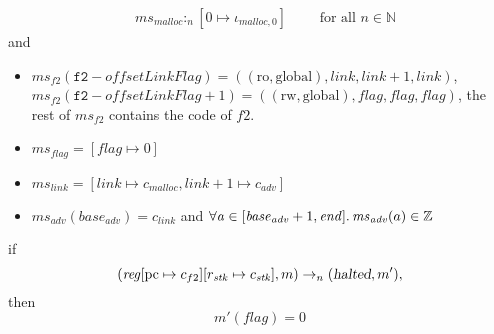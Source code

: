 \documentclass[a4paper]{article}
\newcommand{\update}[2]{[#1 \mapsto #2]}
\newcommand{\var}[1]{\mathit{#1}}
\newcommand{\hs}{\var{ms}}
\newcommand{\ms}{\hs}
\newcommand{\pcreg}{\mathrm{pc}}
\newcommand{\addr}{\var{a}}
\newcommand{\start}{\var{base}}
\newcommand{\addrend}{\var{end}}
\newcommand{\reg}{\var{reg}}
\newcommand{\heap}{\var{mem}}
\newcommand{\adv}{\var{adv}}
\newcommand{\link}{\var{link}}
\newcommand{\stk}{\var{stk}}
\newcommand{\flag}{\var{flag}}
\newcommand{\olf}{\var{offsetLinkFlag}}
\newcommand{\halted}{\textsl{halted}}
\newcommand{\heapSat}[3][\heap]{#1 :_{#2} #3}
\newcommand{\codelabel}[1]{\mathit{#1}}
\newcommand{\malloc}{\codelabel{malloc}}
\newcommand{\nats}{\mathbb{N}}
\newcommand{\ints}{\mathbb{Z}}
\newcommand{\plainperm}[1]{\mathrm{#1}}
\newcommand{\readonly}{\plainperm{ro}}
\newcommand{\readwrite}{\plainperm{rw}}
\newcommand{\glob}{\plainperm{global}}
\newcommand{\step}[1][]{\rightarrow_{#1}}
\begin{document}
\begin{lemma}
\begin{align*}
    &\heapSat[\hs_{\malloc}]{n}{[0 \mapsto \iota_{\malloc,0}]} \qquad \text{ for all $n \in \nats$}
  \end{align*}
  and
  \begin{itemize}
  \item $\ms_{f2}(\mathtt{f2}-\olf) = ((\readonly,\glob),\link,\link+1,\link)$, $\ms_{f2}(\mathtt{f2}-\olf+1) = ((\readwrite,\glob),\flag,\flag,\flag)$, the rest of $\hs_{f2}$ contains the code of $f2$.
  \item $\ms_\flag = [\flag \mapsto 0]$
  \item $\ms_{\var{link}} = [\var{link} \mapsto c_\malloc, \var{link} + 1 \mapsto c_\adv]$
  \item $\hs_\adv(\start_\adv) = c_\link$ and $\forall \addr \in [\start_\adv+1,\addrend]\ldotp \ms_\adv(a) \in \ints$
  \end{itemize}
  if 
  \[
    (\reg\update{\pcreg}{c_{f2}}\update{r_\stk}{c_\stk},m) \step[n] (\halted,m'),
  \]
  then
  \[
    m'(\flag) = 0
  \]  
\end{lemma}
\end{document}
